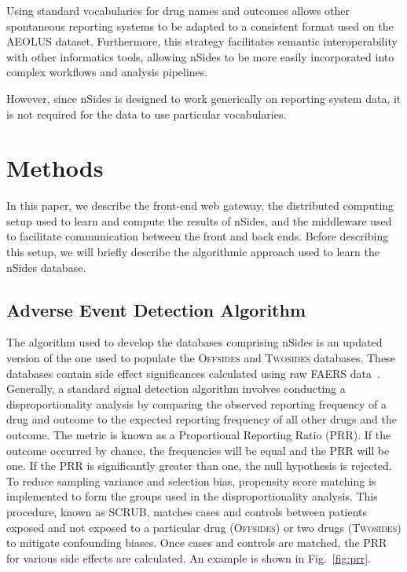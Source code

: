 \documentclass{ws-procs11x85}
\begin{document}
Using standard vocabularies for drug names and outcomes allows
other spontaneous reporting systems to be adapted to a consistent
format used on the AEOLUS dataset. Furthermore, this strategy facilitates
semantic interoperability with other informatics tools, allowing nSides to be
more easily incorporated into complex workflows and analysis pipelines.

However, since nSides is designed to work generically on reporting
system data, it is not required for the data to use particular
vocabularies.

\section{Methods}
In this paper, we describe the front-end web gateway, the distributed
computing setup used to learn and compute the results of nSides, and
the middleware used to facilitate communication between the front and
back ends. Before describing this setup, we will briefly describe the
algorithmic approach used to learn the nSides database.

\subsection{Adverse Event Detection Algorithm}
The algorithm used to develop the databases comprising nSides is an
updated version of the one used to populate the O\textsc{ffsides} and
T\textsc{wosides} databases.  These databases contain side effect
significances calculated using raw FAERS data~\cite{Tatonetti2012}.
Generally, a standard signal detection algorithm involves conducting a
disproportionality analysis by comparing the observed reporting
frequency of a drug and outcome to the expected reporting frequency of
all other drugs and the outcome. The metric is known as a Proportional
Reporting Ratio (PRR). If the outcome occurred by chance, the
frequencies will be equal and the PRR will be one. If the PRR is
significantly greater than one, the null hypothesis is rejected. To
reduce sampling variance and selection bias, propensity score matching
is implemented to form the groups used in the disproportionality
analysis. This procedure, known as SCRUB, matches cases and controls
between patients exposed and not exposed to a particular drug
(O\textsc{ffsides}) or two drugs (T\textsc{wosides}) to mitigate
confounding biases. Once cases and controls are matched, the PRR for
various side effects are calculated. An example is shown in
Fig.~\ref{fig:prr}.
\end{document}
